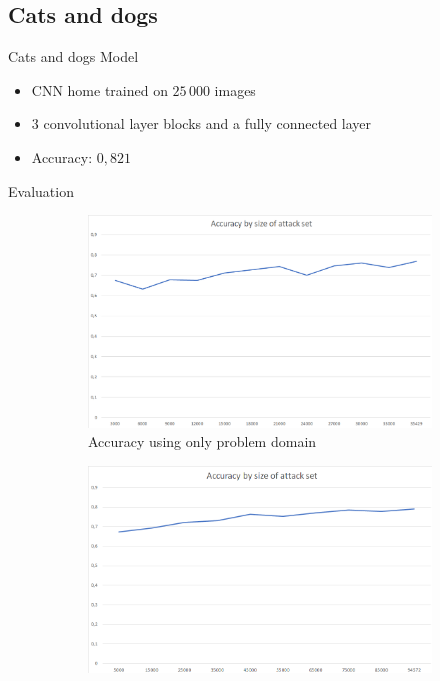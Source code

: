 \documentclass[10pt]{beamer}
\begin{document}
\subsection[Cats and dogs]{Cats and dogs}
\begin{frame}[fragile]{Cats and dogs Model}
\begin{itemize}
\item CNN home trained on $25\,000$ images
\item $3$ convolutional layer blocks and a fully connected layer
\item Accuracy: $0,821$
\end{itemize}
\end{frame}
\begin{frame}[fragile]{Evaluation}
                \begin{figure}[h!]
            \centering
            \begin{subfigure}[c]{0.49\textwidth}
                \centering
                \includegraphics[width=1\textwidth]{exercise_3/paper/images/Accuracy_copy_cat_domain.png}
                \caption{Accuracy using only problem domain}
                \label{fig:Accuracy_Cat_domain}
            \end{subfigure}
            \begin{subfigure}[c]{0.49\textwidth}
                \centering
                \includegraphics[width=1\textwidth]{exercise_3/paper/images/Accuracy_copy_cat.png}

\end{subfigure}
\end{figure}
\end{frame}
\end{document}
